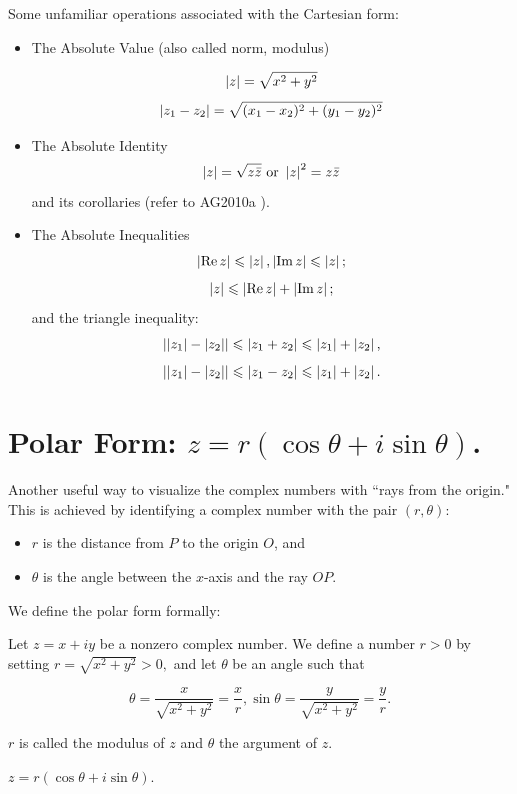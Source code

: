 \documentclass[11pt,reqno,oneside,a4paper]{article}
\begin{document}
Some unfamiliar operations associated with the Cartesian form: 
\begin{itemize}
	\item The Absolute Value (also called norm, modulus)
	
	$$\left\lvert z\right\rvert = \sqrt{x^2 + y^2}$$
	$$\left\lvert z_1 - z_2\right\rvert = \sqrt{(x_1-x_2)^2 + (y_1 - y_2)^2}$$
	
	\item The Absolute Identity
	$$\left\lvert z\right\rvert = \sqrt{z \bar{z}} \text{ or } \left\lvert z\right\rvert^2 = z \bar{z}$$
	and its corollaries (refer to AG2010a \cite{AG2010a}). 
	
	\item The Absolute Inequalities
	$$\left\lvert\operatorname*{Re} z\right\rvert \leqslant \left\lvert z\right\rvert, \left\lvert\operatorname*{Im} z\right\rvert \leqslant \left\lvert z\right\rvert;$$
	$$\left\lvert z\right\rvert \leqslant \left\lvert\operatorname*{Re} z\right\rvert + \left\lvert\operatorname*{Im} z\right\rvert;$$
	and the triangle inequality: 
	$$\left\lvert\left\lvert z_1\right\rvert-\left\lvert z_2\right\rvert\right\rvert \leqslant \left\lvert z_1 + z_2\right\rvert \leqslant \left\lvert z_1\right\rvert + \left\lvert z_2\right\rvert,$$
	$$\left\lvert\left\lvert z_1\right\rvert-\left\lvert z_2\right\rvert\right\rvert \leqslant \left\lvert z_1 - z_2\right\rvert \leqslant \left\lvert z_1\right\rvert + \left\lvert z_2\right\rvert.$$ 
\end{itemize}

\section{Polar Form: $z = r(\cos\theta + i\sin\theta)$.}
Another useful way to visualize the complex numbers with ``rays from the origin." This is achieved by identifying a complex number with the pair $(r,\theta):$ 
\begin{itemize}
	\item $r$ is the distance from $P$ to the origin $O$, and 
	\item $\theta$ is the angle between the $x$-axis and the ray $OP$. 
\end{itemize}

We define the polar form formally: 

\begin{defn}
	Let $z=x+iy$ be a nonzero complex number. We define a number $r>0$ by setting $r = \sqrt{x^2 + y^2}>0,$ and let $\theta$ be an angle such that 
	
	$$\theta = \frac{x}{\sqrt{x^2 + y^2}} = \frac{x}{r}, \sin \theta = \frac{y}{\sqrt{x^2 + y^2}} = \frac{y}{r}.$$
	
	$r$ is called the modulus of $z$  and $\theta$ the argument of $z$. 
	
	$z = r(\cos\theta + i\sin\theta).$
\end{defn}
\end{document}
